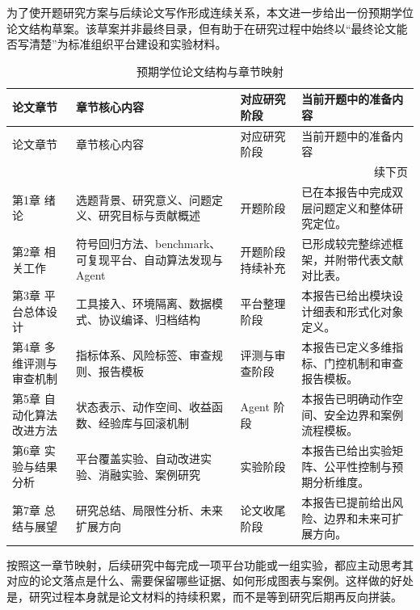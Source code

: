 \documentclass[UTF8,12pt]{ctexart}
\begin{document}
为了使开题研究方案与后续论文写作形成连续关系，本文进一步给出一份预期学位论文结构草案。该草案并非最终目录，但有助于在研究过程中始终以“最终论文能否写清楚”为标准组织平台建设和实验材料。

\small
\begin{longtable}{p{2.5cm}p{4.0cm}p{2.8cm}p{5.0cm}}
\caption{预期学位论文结构与章节映射}\label{tab:thesis-map}\\
\toprule
论文章节 & 章节核心内容 & 对应研究阶段 & 当前开题中的准备内容 \\
\midrule
\endfirsthead
\toprule
论文章节 & 章节核心内容 & 对应研究阶段 & 当前开题中的准备内容 \\
\midrule
\endhead
\midrule
\multicolumn{4}{r}{续下页}\\
\endfoot
\bottomrule
\endlastfoot
第1章 绪论 & 选题背景、研究意义、问题定义、研究目标与贡献概述 & 开题阶段 & 已在本报告中完成双层问题定义和整体研究定位。 \\
第2章 相关工作 & 符号回归方法、benchmark、可复现平台、自动算法发现与 Agent & 开题阶段持续补充 & 已形成较完整综述框架，并附带代表文献对比表。 \\
第3章 平台总体设计 & 工具接入、环境隔离、数据模式、协议编译、归档结构 & 平台整理阶段 & 本报告已给出模块设计细表和形式化对象定义。 \\
第4章 多维评测与审查机制 & 指标体系、风险标签、审查规则、报告模板 & 评测与审查阶段 & 本报告已定义多维指标、门控机制和审查报告模板。 \\
第5章 自动化算法改进方法 & 状态表示、动作空间、收益函数、经验库与回滚机制 & Agent 阶段 & 本报告已明确动作空间、安全边界和案例流程模板。 \\
第6章 实验与结果分析 & 平台覆盖实验、自动改进实验、消融实验、案例研究 & 实验阶段 & 本报告已给出实验矩阵、公平性控制与预期分析维度。 \\
第7章 总结与展望 & 研究总结、局限性分析、未来扩展方向 & 论文收尾阶段 & 本报告已提前给出风险、边界和未来可扩展方向。 \\
\end{longtable}
\normalsize

按照这一章节映射，后续研究中每完成一项平台功能或一组实验，都应主动思考其对应的论文落点是什么、需要保留哪些证据、如何形成图表与案例。这样做的好处是，研究过程本身就是论文材料的持续积累，而不是等到研究后期再反向拼装。



\end{document}
